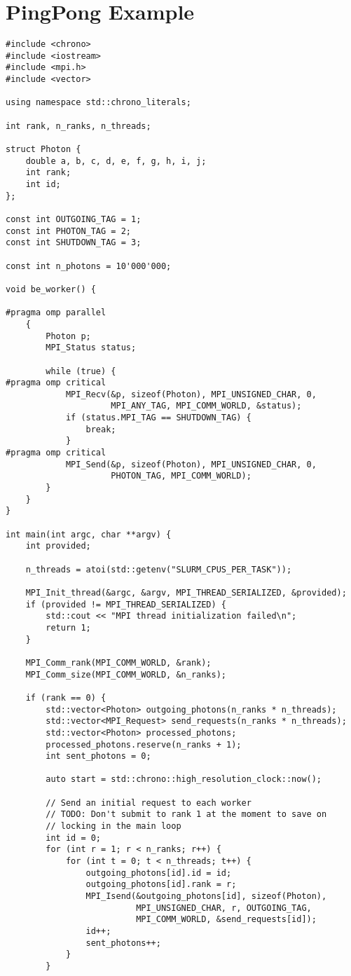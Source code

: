 \section{PingPong Example}
\label{appendix:pingpong}
\begin{lstlisting}
#include <chrono>
#include <iostream>
#include <mpi.h>
#include <vector>

using namespace std::chrono_literals;

int rank, n_ranks, n_threads;

struct Photon {
    double a, b, c, d, e, f, g, h, i, j;
    int rank;
    int id;
};

const int OUTGOING_TAG = 1;
const int PHOTON_TAG = 2;
const int SHUTDOWN_TAG = 3;

const int n_photons = 10'000'000;

void be_worker() {

#pragma omp parallel
    {
        Photon p;
        MPI_Status status;

        while (true) {
#pragma omp critical
            MPI_Recv(&p, sizeof(Photon), MPI_UNSIGNED_CHAR, 0,
                     MPI_ANY_TAG, MPI_COMM_WORLD, &status);
            if (status.MPI_TAG == SHUTDOWN_TAG) {
                break;
            }
#pragma omp critical
            MPI_Send(&p, sizeof(Photon), MPI_UNSIGNED_CHAR, 0,
                     PHOTON_TAG, MPI_COMM_WORLD);
        }
    }
}

int main(int argc, char **argv) {
    int provided;

    n_threads = atoi(std::getenv("SLURM_CPUS_PER_TASK"));

    MPI_Init_thread(&argc, &argv, MPI_THREAD_SERIALIZED, &provided);
    if (provided != MPI_THREAD_SERIALIZED) {
        std::cout << "MPI thread initialization failed\n";
        return 1;
    }

    MPI_Comm_rank(MPI_COMM_WORLD, &rank);
    MPI_Comm_size(MPI_COMM_WORLD, &n_ranks);

    if (rank == 0) {
        std::vector<Photon> outgoing_photons(n_ranks * n_threads);
        std::vector<MPI_Request> send_requests(n_ranks * n_threads);
        std::vector<Photon> processed_photons;
        processed_photons.reserve(n_ranks + 1);
        int sent_photons = 0;

        auto start = std::chrono::high_resolution_clock::now();

        // Send an initial request to each worker
        // TODO: Don't submit to rank 1 at the moment to save on
        // locking in the main loop
        int id = 0;
        for (int r = 1; r < n_ranks; r++) {
            for (int t = 0; t < n_threads; t++) {
                outgoing_photons[id].id = id;
                outgoing_photons[id].rank = r;
                MPI_Isend(&outgoing_photons[id], sizeof(Photon),
                          MPI_UNSIGNED_CHAR, r, OUTGOING_TAG,
                          MPI_COMM_WORLD, &send_requests[id]);
                id++;
                sent_photons++;
            }
        }


\end{lstlisting}

